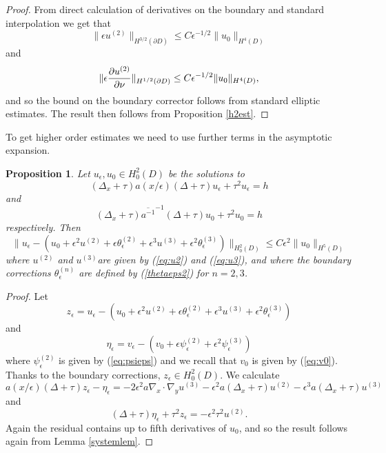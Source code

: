 \documentclass[12pt]{article}
\newtheorem{proposition}{Proposition}
\begin{document}
\begin{proof} From direct calculation of derivatives on the boundary and standard interpolation we get that $$ \| \epsilon u^{(2)} \|_{H^{3/2}(\partial D)}\leq C\epsilon^{-1/2} \| u_0 \|_{H^4( D)}$$ and $$ \| \epsilon{ \partial u^{(2)}\over{\partial\nu}} \|_{H^{1/2}(\partial D)}\leq C\epsilon^{-1/2} \| u_0 \|_{H^4( D)},$$ and so the bound on the boundary corrector follows from standard elliptic estimates. The result then follows from Proposition \ref{h2est}.
\end{proof}
\noindent
To get higher order estimates we need to use further terms in the asymptotic expansion. 
\begin{proposition}\label{h2est2} Let $u_\epsilon, u_0 \in H^2_0( D)$  be the solutions to 
\begin{equation} \label{fourthordeqest}  (\Delta_x +\tau) a(x/\epsilon) (\Delta +\tau) u_\epsilon +\tau^2 u_\epsilon= h \end{equation}
and
\begin{equation} \label{homogeqest}  (\Delta_x +\tau) \overline{a^{-1}}^{-1} (\Delta +\tau) u_0 +\tau^2 u_0= h \end{equation}
respectively. Then 
$$ \| u_\epsilon -(u_0 +\epsilon^2 u^{(2)}  +\epsilon\theta_\epsilon^{(2)}+ \epsilon^3 u^{(3)}  +\epsilon^2\theta_\epsilon^{(3)} ) \|_{H_0^2( D)} \leq C\epsilon^2 \| u_0 \|_{H^5( D)} $$
where $u^{(2)}$ and $u^{(3)}$are given by (\ref{eq:u2}) and (\ref{eq:u3}), and where the boundary corrections $\theta^{(n)}_\epsilon$ are defined by (\ref{thetaeps2}) for $n=2,3$. 
\end{proposition} 
\begin{proof} Let 
$$ z_\epsilon =  u_\epsilon -(u_0 +\epsilon^2 u^{(2)}  +\epsilon \theta_\epsilon^{(2)} +\epsilon^3  u^{(3)}  +\epsilon^2\theta_\epsilon^{(3)}  ) $$
and $$ \eta_\epsilon = v_\epsilon -(v_0 + \epsilon  \psi_\epsilon^{(2)}+  \epsilon^2  \psi_\epsilon^{(3)} )$$
where $\psi_\epsilon^{(2)}$ is given by (\ref{eq:psieps}) and we recall that $v_0$ is given by (\ref{eq:v0}).  Thanks to the boundary corrections, $z_\epsilon\in H^2_0( D)$. We calculate 
\begin{equation} a(x/\epsilon) (\Delta +\tau )z_\epsilon - \eta_\epsilon  = -2\epsilon^2  a \nabla_x\cdot\nabla_y u^{(3)} - \epsilon^2 a(\Delta_x+\tau)u^{(2)}   -\epsilon^3 a(\Delta_x+\tau)u^{(3)}\end{equation}
and
\begin{equation} (\Delta +\tau )\eta_\epsilon  +\tau^2 z_\epsilon = -\epsilon^2 \tau^2 u^{(2)} .\end{equation}
Again the residual contains up to fifth derivatives of $u_0$, and so the result follows again from Lemma \ref{systemlem}. 
\end{proof}
\end{document}
